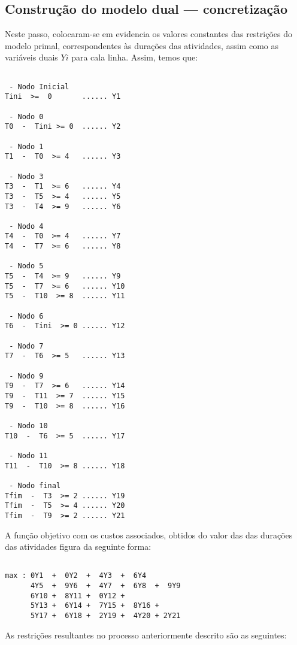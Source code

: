 \newpage
\subsection{Construção do modelo dual --- concretização}
Neste passo, colocaram-se em evidencia os valores constantes das restrições do
modelo primal, correspondentes às durações das atividades, assim como as
variáveis duais $Yi$ para cala linha. Assim, temos que:


\begin{verbatim}

 - Nodo Inicial
Tini  >=  0       ...... Y1

 - Nodo 0
T0  -  Tini >= 0  ...... Y2

 - Nodo 1
T1  -  T0  >= 4   ...... Y3

 - Nodo 3
T3  -  T1  >= 6   ...... Y4
T3  -  T5  >= 4   ...... Y5
T3  -  T4  >= 9   ...... Y6

 - Nodo 4
T4  -  T0  >= 4   ...... Y7
T4  -  T7  >= 6   ...... Y8

 - Nodo 5
T5  -  T4  >= 9   ...... Y9
T5  -  T7  >= 6   ...... Y10
T5  -  T10  >= 8  ...... Y11

 - Nodo 6
T6  -  Tini  >= 0 ...... Y12

 - Nodo 7
T7  -  T6  >= 5   ...... Y13

 - Nodo 9
T9  -  T7  >= 6   ...... Y14
T9  -  T11  >= 7  ...... Y15
T9  -  T10  >= 8  ...... Y16

 - Nodo 10
T10  -  T6  >= 5  ...... Y17

 - Nodo 11
T11  -  T10  >= 8 ...... Y18

 - Nodo final
Tfim  -  T3  >= 2 ...... Y19
Tfim  -  T5  >= 4 ...... Y20
Tfim  -  T9  >= 2 ...... Y21

\end{verbatim}

A função objetivo com os custos associados, obtidos do valor das das durações
das atividades figura da seguinte forma:

\begin{verbatim}

max : 0Y1  +  0Y2  +  4Y3  +  6Y4    
      4Y5  +  9Y6  +  4Y7  +  6Y8  +  9Y9 
      6Y10 +  8Y11 +  0Y12 +  
      5Y13 +  6Y14 +  7Y15 +  8Y16 +  
      5Y17 +  6Y18 +  2Y19 +  4Y20 + 2Y21 

\end{verbatim}

As restrições resultantes no processo anteriormente descrito são as seguintes:


